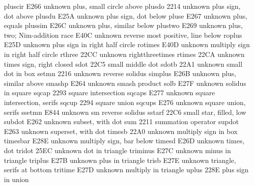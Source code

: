  pluscir               E266 {unknown} plus, small circle above
 plusdo                2214 {unknown} plus sign, dot above
 plusdu                E25A {unknown} plus sign, dot below
 pluse                 E267 {unknown} plus, equals
 plussim               E26C {unknown} plus, similar below
 plustwo               E269 {unknown} plus, two; Nim-addition
 race                  E40C {unknown} reverse most positive, line below
 roplus                E25D {unknown} plus sign in right half circle
 rotimes               E40D {unknown} multiply sign in right half circle
 rthree                22CC {unknown} rightthreetimes
 rtimes                22CA {unknown} times sign, right closed
 sdot                  22C5 {\cdot} small middle dot
 sdotb                 22A1 {unknown} small dot in box
 setmn                 2216 {unknown} reverse solidus
 simplus               E26B {unknown} plus, similar above
 smashp                E264 {unknown} smash product
 solb                  E27F {unknown} solidus in square
 sqcap                 2293 {\sqcap} square intersection
 sqcaps                E277 {unknown} square intersection, serifs
 sqcup                 2294 {\sqcup} square union
 sqcups                E276 {unknown} square union, serifs
 ssetmn                E844 {unknown} sm reverse solidus
 sstarf                22C6 {\star} small star, filled, low
 subdot                E262 {unknown} subset, with dot
 sum                   2211 {\sum} summation operator
 supdot                E263 {unknown} superset, with dot
 timesb                22A0 {unknown} multiply sign in box
 timesbar              E28E {unknown} multiply sign, bar below
 timesd                E26D {unknown} times, dot
 tridot                25EC {unknown} dot in triangle
 triminus              E27C {unknown} minus in triangle
 triplus               E27B {unknown} plus in triangle
 trisb                 E27E {unknown} triangle, serifs at bottom
 tritime               E27D {unknown} multiply in triangle
 uplus                 228E {\uplus} plus sign in union
